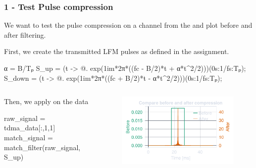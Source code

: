 \documentclass[compress,aspectratio=169]{beamer}
\begin{document}
\begin{frame}[fragile] %
    \frametitle{1 - Test Pulse compression}
    We want to test the pulse compression on a channel from the 
    and plot before and after filtering.

    First, we create the transmitted LFM pulses as defined in the
    assignment.
    \begin{jllisting}[gobble=8]
        α = B/Tₚ
        S_up   = (t -> @. exp(1im*2π*((fc - B/2)*t + α*t^2/2)))(0s:1/fs:Tₚ);
        S_down = (t -> @. exp(1im*2π*((fc + B/2)*t - α*t^2/2)))(0s:1/fs:Tₚ);
    \end{jllisting}
    \begin{columns}
        \begin{column}{0.5\textwidth}
            Then, we apply  on the data
            \begin{jllisting}[gobble=16]
                raw_signal = tdma_data[:,1,1]
                match_signal = match_filter(raw_signal, S_up)
            \end{jllisting}
        \end{column}
        \begin{column}{0.5\textwidth}
            \begin{figure}
                \includegraphics[width=\columnwidth]{"../1.pdf"}
            \end{figure}
        \end{column}
    \end{columns}
\end{frame}
\end{document}
